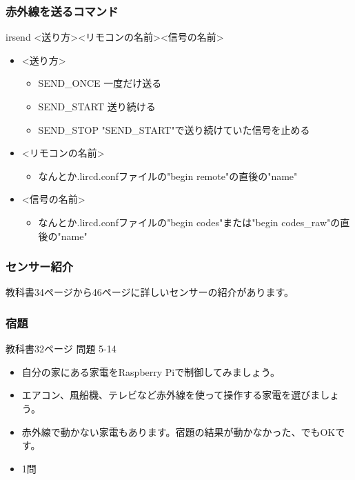 \begin{frame}
    \frametitle{赤外線を送るコマンド}
    irsend \textless 送り方\textgreater \textless リモコンの名前\textgreater \textless 信号の名前\textgreater

    \begin{itemize}
        \item \textless 送り方\textgreater
        \begin{itemize}
            \item SEND\_ONCE 一度だけ送る
            \item SEND\_START 送り続ける
            \item SEND\_STOP "SEND\_START"で送り続けていた信号を止める
        \end{itemize}
        \item \textless リモコンの名前\textgreater
        \begin{itemize}
            \item なんとか.lircd.confファイルの"begin remote"の直後の"name"
        \end{itemize}
        \item \textless 信号の名前\textgreater
        \begin{itemize}
            \item なんとか.lircd.confファイルの"begin codes"または"begin codes\_raw"の直後の"name"
        \end{itemize}
    \end{itemize}
\end{frame}

\begin{frame}
    \frametitle{センサー紹介}
    教科書34ページから46ページに詳しいセンサーの紹介があります。
\end{frame}

\begin{frame}
    \frametitle{宿題}
    教科書32ページ 問題 5-14
    \begin{itemize}
        \item 自分の家にある家電をRaspberry Piで制御してみましょう。
        \item エアコン、風船機、テレビなど赤外線を使って操作する家電を選びましょう。
        \item 赤外線で動かない家電もあります。宿題の結果が動かなかった、でもOKです。
        \item 1問
    \end{itemize}
\end{frame}